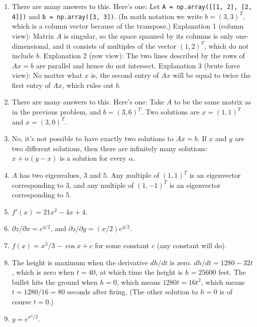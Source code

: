 \documentclass[11pt]{article}
\begin{document}
\begin{enumerate}
\item
There are many answers to this.  Here's one:
Let {\tt A = np.array([[1, 2], [2, 4]])} 
and {\tt b = np.array([3, 3])}.
(In math notation we write $b=(3,3)^T$, 
which is a column vector because of the transpose.)
Explanation 1 (column view): 
Matrix $A$ is singular, so the space spanned
by its columns is only one-dimensional, and it consists of
multiples of the vector $(1,2)^T$, which do not include $b$.
Explanation 2 (row view):
The two lines described by the rows of $Ax=b$ are parallel
and hence do not intersect.
Explanation 3 (brute force view):
No matter what $x$ is, the second entry of $Ax$ will be equal
to twice the first entry of $Ax$, which rules out $b$.

\item
There are many answers to this.  Here's one:
Take $A$ to be the same matrix as in the previous problem,
and $b = (3,6)^T$.
Two solutions are $x = (1,1)^T$ and $x = (3,0)^T$.

\item
No, it's not possible to have exactly two solutions to $Ax=b$.
If $x$ and $y$ are two different solutions, then there are
infinitely many solutions: $x + \alpha(y-x)$ is a solution
for every $\alpha$.

\item
$A$ has two eigenvalues, $3$ and $5$.
Any multiple of $(1,1)^T$ is an eigenvector corresponding to $3$,
and any multiple of $(1,-1)^T$ is an eigenvector corresponding to $5$.

\item
$f'(x)=21x^2-4x+4$.

\item
$\partial z / \partial x = e^{y/2}$, and
$\partial z / \partial y = (x/2)e^{y/2}$.

\item
$f(x) = x^3/3 - \cos x + c$ for some constant $c$ (any constant will do).

\item
The height is maximum when the derivative $dh/dt$ is zero.
$dh/dt = 1280-32t$, which is zero when $t = 40$, 
at which time the height is $h = 25600$ feet.
The bullet hits the ground when $h=0$,
which means $1280t = 16t^2$, which means $t=1280/16 = 80$ seconds after
firing.
(The other solution to $h=0$ is of course $t=0$.)

\item
$y=e^{x^2/2}$.  

\end{enumerate}
\end{document}

